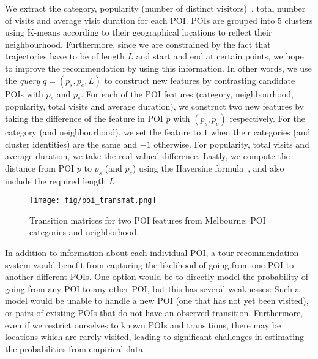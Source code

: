 We extract the category, popularity (number of distinct visitors)~\cite{ht10}, total number of visits and average visit duration for each POI.
POIs are grouped into $5$ clusters using K-means according to their geographical locations to reflect their neighbourhood.
Furthermore, since we are constrained by the fact that trajectories have to be of length $L$ and start and end at certain points, we hope to improve the recommendation by using this information.
In other words, we use the \textit{query} $q = (p_s, p_e, L)$ to construct new features by contrasting candidate POIs with $p_s$ and $p_e$.
%
For each of the POI features (category, neighbourhood, popularity, total visits and average duration),
we construct two new features by taking the difference of the feature in POI $p$ with $(p_s, p_e)$ respectively.
For the category (and neighbourhood), we set the feature to $1$ when their categories (and cluster identities) are the same and $-1$ otherwise.
For popularity, total visits and average duration, we take the real valued difference.
Lastly, we compute the distance from POI $p$ to $p_s$ (and $p_e$) using the Haversine formula~\cite{haversine},
and also include the required length $L$.




\begin{figure}[t]
\texttt{[image: fig/poi\_transmat.png]}
\caption{Transition matrices for two POI features from Melbourne: POI categories and neighborhood.
}
\label{fig:transmat}\captionmoveup
\end{figure}


In addition to information about each individual POI, a tour recommendation system would benefit
from capturing the likelihood of going from one POI to another different POIs. One option would be to
directly model the probability of going from any POI to any other POI, but this has several weaknesses:
Such a model would be unable to handle a new POI (one that has not yet been visited),
or pairs of existing POIs that do not have an observed transition.
Furthermore, even if we restrict ourselves to known POIs and transitions,
there may be locations which are rarely visited,
leading to significant challenges in estimating the probabilities from empirical data.

